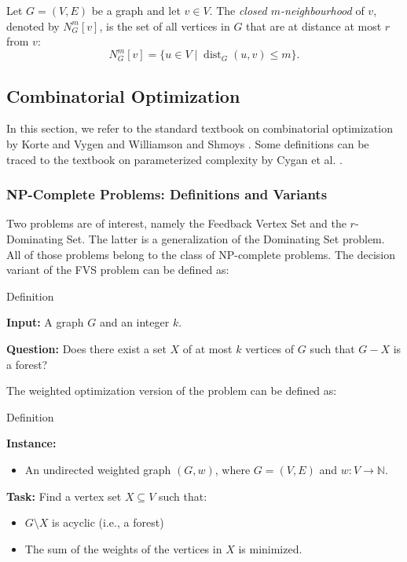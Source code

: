 Let \( G = (V, E) \) be a graph and let \( v \in V \).
The \emph{closed \( m \)-neighbourhood} of \( v \), denoted by \( N^{m}_{G}[v] \),
is the set of all vertices in \( G \) that are at distance at most \( r \) from \( v \):
\[
N^{m}_{G}[v] = \{ u \in V \mid \operatorname{dist}_G(u, v) \leq m \}.
\]

\subsection{Combinatorial Optimization}

In this section, we refer to the standard textbook on combinatorial optimization by Korte 
and Vygen \cite{Korte2007CombinatorialOT} and 
Williamson and Shmoys \cite{williamson2011design}. Some definitions can be traced to 
the textbook on parameterized complexity by Cygan et al. \cite{cygan2015parameterized}.

\subsubsection{NP-Complete Problems: Definitions and Variants}

Two problems are of interest, namely the Feedback Vertex Set and the $r$-Dominating Set. The latter 
is a generalization of the Dominating Set problem.
All of those problems belong to the class of NP-complete problems. 
The decision variant of the FVS problem can be defined as:

\begin{mydefinition}{Definition}

    \label{FVS}
    \textbf{Input:}
    A graph $G$ and an integer $k$.

    \textbf{Question:}
    Does there exist a set $X$ of at most $k$ vertices of $G$ such that $G - X$ is a forest?
    
\end{mydefinition}

 The weighted optimization version of the problem can be defined as:

\begin{mydefinition}{Definition}
    \label{MWFVS}

    \textbf{Instance:}
    \begin{itemize}[noitemsep, topsep=0pt]
        \item An undirected weighted graph $(G, w)$, where $G = (V, E)$ and $w: V \to \mathbb{N}$.
    \end{itemize}
    \textbf{Task:}
    Find a vertex set $X \subseteq V$ such that:
    \begin{itemize}[noitemsep, topsep=0pt]
        \item \( G \setminus X \) is acyclic (i.e., a forest)
        \item The sum of the weights of the vertices in $X$ is minimized.
    \end{itemize}

\end{mydefinition}


